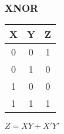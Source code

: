 \documentclass{article}
\begin{document}
\begin{multicols}{2}
\begin{center}
            \subsubsection*{XNOR}
            \vspace{1em}
            \begin{tabular}{cc|c}
                X \hspace{1em} & Y \hspace{1em} & \hspace{1em}Z \\
                \hline
                0 \hspace{1em} & 0 \hspace{1em} & \hspace{1em}1 \\
                0 \hspace{1em} & 1 \hspace{1em} & \hspace{1em}0 \\
                1 \hspace{1em} & 0 \hspace{1em} & \hspace{1em}0 \\
                1 \hspace{1em} & 1 \hspace{1em} & \hspace{1em}1 \\
            \end{tabular}

            \vspace{2em}
            $Z=XY+X'Y'$
        \end{center}
    \end{multicols}
\end{document}
